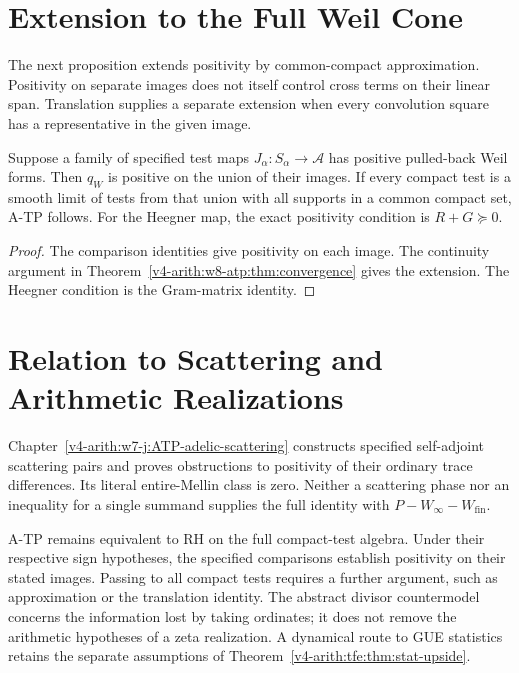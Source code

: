 \section{Extension to the Full Weil Cone}
\label{v4-arith:w8-atp:residual}

The next proposition extends positivity by common-compact approximation.
Positivity on separate images does not itself control cross terms on
their linear span. Translation supplies a separate extension when every
convolution square has a representative in the given image.

\begin{proposition}
\label{v4-arith:w8-atp:prop:consolidated}
Suppose a family of specified test maps $J_\alpha:S_\alpha\to
\mathscr A$ has positive pulled-back Weil forms. Then $q_W$
is positive on the union of their images. If every compact test
is a smooth limit of tests from that union with all supports
in a common compact set, A-TP follows. For the Heegner map,
the exact positivity condition is $R+G\succeq0$.
\end{proposition}
\begin{proof}
The comparison identities give positivity on each image.
The continuity argument in
Theorem~\ref{v4-arith:w8-atp:thm:convergence} gives the extension.
The Heegner condition is the Gram-matrix identity.
\end{proof}

\section{Relation to Scattering and Arithmetic Realizations}
\label{v4-arith:w8-atp:relations}

Chapter~\ref{v4-arith:w7-j:ATP-adelic-scattering} constructs specified
self-adjoint scattering pairs and proves obstructions to positivity
of their ordinary trace differences. Its literal entire-Mellin class
is zero. Neither a scattering phase nor an inequality for a single
summand supplies the full identity with $P-W_\infty-W_{\mathrm{fin}}$.

A-TP remains equivalent to RH on the full compact-test algebra.
Under their respective sign hypotheses, the specified comparisons
establish positivity on their stated images. Passing to all compact
tests requires a further argument, such as approximation or the
translation identity. The abstract
divisor countermodel concerns the information lost by taking
ordinates; it does not remove the arithmetic hypotheses of
a zeta realization. A dynamical route to GUE statistics retains
the separate assumptions of
Theorem~\ref{v4-arith:tfe:thm:stat-upside}.

